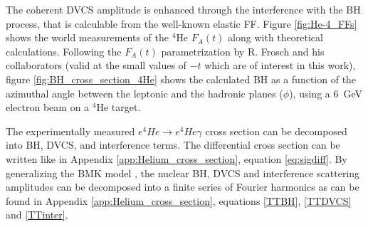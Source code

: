 The coherent DVCS amplitude is enhanced through the interference with the BH process, that is calculable from the well-known elastic FF. Figure \ref{fig:He-4_FFs} shows the world measurements of the $^4$He $F_{A}(t)$ along with theoretical calculations. Following the $F_{A}(t)$ parametrization by R. Frosch and his collaborators \cite{He_4_FF_Frosch} (valid at the small values of $-t$ which are of interest in this work), figure \ref{fig:BH_cross_section_4He} shows the calculated BH as a function of the azimuthal angle between the leptonic and the hadronic planes ($\phi$), using a 6~GeV electron beam on a $^4$He target.

  The experimentally measured $e ^4He \rightarrow e ^4He \gamma$ cross section can be decomposed into BH, DVCS, and interference terms. The differential cross section can be written like in Appendix \ref{app:Helium_cross_section}, equation \ref{eq:sigdiff}. By generalizing the BMK model \cite{Kir}, the nuclear BH, DVCS and interference scattering amplitudes can be decomposed into a finite series of Fourier harmonics as can be found in Appendix \ref{app:Helium_cross_section}, equations \ref{TTBH}, \ref{TTDVCS} and \ref{TTinter}.

